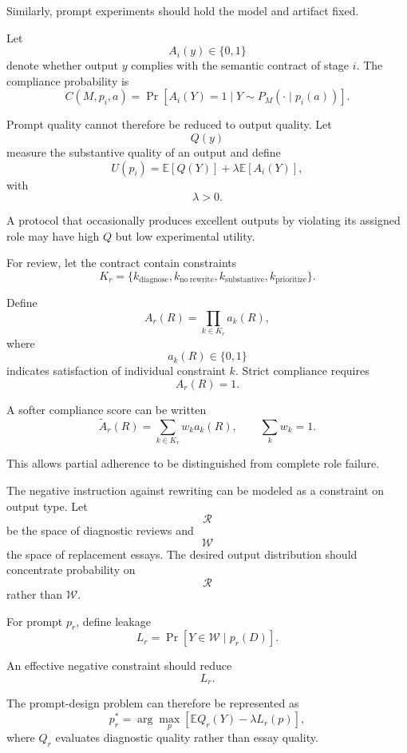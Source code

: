 \documentclass[11pt]{article}
\begin{document}
Similarly, prompt experiments should hold the model and artifact fixed.

Let
\[
    A_i(y)\in\{0,1\}
\]
denote whether output \(y\) complies with the semantic contract of stage \(i\). The compliance probability is
\[
    C(M,p_i,a)
    =
    \Pr
    \left[
        A_i(Y)=1
        \mid
        Y\sim P_M(\cdot\mid p_i(a))
    \right].
\]

Prompt quality cannot therefore be reduced to output quality. Let
\[
    Q(y)
\]
measure the substantive quality of an output and define
\[
    U(p_i)
    =
    \mathbb{E}[Q(Y)]
    +
    \lambda
    \mathbb{E}[A_i(Y)],
\]
with
\[
    \lambda>0.
\]

A protocol that occasionally produces excellent outputs by violating its assigned role may have high \(Q\) but low experimental utility.

For review, let the contract contain constraints
\[
    K_r
    =
    \{
        k_{\mathrm{diagnose}},
        k_{\mathrm{no\ rewrite}},
        k_{\mathrm{substantive}},
        k_{\mathrm{prioritize}}
    \}.
\]

Define
\[
    A_r(R)
    =
    \prod_{k\in K_r}
    a_k(R),
\]
where
\[
    a_k(R)\in\{0,1\}
\]
indicates satisfaction of individual constraint \(k\). Strict compliance requires
\[
    A_r(R)=1.
\]

A softer compliance score can be written
\[
    \widetilde A_r(R)
    =
    \sum_{k\in K_r}
    w_k a_k(R),
\qquad
    \sum_k w_k=1.
\]

This allows partial adherence to be distinguished from complete role failure.

The negative instruction against rewriting can be modeled as a constraint on output type. Let
\[
    \mathcal{R}
\]
be the space of diagnostic reviews and
\[
    \mathcal{W}
\]
the space of replacement essays. The desired output distribution should concentrate probability on
\[
    \mathcal{R}
\]
rather than \(\mathcal{W}\).

For prompt \(p_r\), define leakage
\[
    L_r
    =
    \Pr[
        Y\in\mathcal{W}
        \mid
        p_r(D)
    ].
\]

An effective negative constraint should reduce
\[
    L_r.
\]

The prompt-design problem can therefore be represented as
\[
    p_r^\ast
    =
    \arg\max_p
    \left[
        \mathbb{E}Q_r(Y)
        -
        \lambda L_r(p)
    \right],
\]
where \(Q_r\) evaluates diagnostic quality rather than essay quality.
\end{document}

